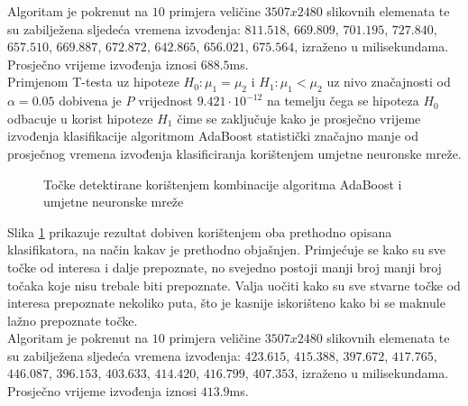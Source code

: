 \documentclass[times, utf8, zavrsni, numeric]{fer}
\begin{document}
Algoritam je pokrenut na $10$ primjera veličine $3507x2480$ slikovnih elemenata te su zabilježena sljedeća vremena izvođenja: $811.518$, $669.809$, $701.195$, $727.840$, $657.510$, $669.887$, $672.872$, $642.865$, $656.021$, $675.564$, izraženo u milisekundama. 
Prosječno vrijeme izvođenja iznosi $688.5$ms.\\

Primjenom T-testa uz hipoteze $H_0: \mu_1 = \mu_2$ i $H_1: \mu_1 < \mu_2$ uz nivo značajnosti od $\alpha = 0.05$ dobivena je $P$ vrijednost $9.421\cdot10^{-12}$ na temelju čega se hipoteza $H_0$ odbacuje u korist hipoteze $H_1$ čime se zaključuje kako je prosječno vrijeme izvođenja klasifikacije algoritmom AdaBoost statistički značajno manje od prosječnog vremena izvođenja klasificiranja korištenjem umjetne neuronske mreže.

\begin{figure}[!ht]
    \centering
    \captionsetup{justification=centering}
    \caption{Točke detektirane korištenjem kombinacije algoritma AdaBoost i umjetne neuronske mreže}
    \label{fig:combinedResult}
\end{figure}

Slika \ref{fig:combinedResult} prikazuje rezultat dobiven korištenjem oba prethodno opisana klasifikatora, na način kakav je prethodno objašnjen.
Primjećuje se kako su sve točke od interesa i dalje prepoznate, no svejedno postoji manji broj manji broj točaka koje nisu trebale biti prepoznate.
Valja uočiti kako su sve stvarne točke od interesa prepoznate nekoliko puta, što je kasnije iskorišteno kako bi se maknule lažno prepoznate točke.\\

Algoritam je pokrenut na $10$ primjera veličine $3507x2480$ slikovnih elemenata te su zabilježena sljedeća vremena izvođenja: $423.615$, $415.388$, $397.672$, $417.765$, $446.087$, $396.153$, $403.633$, $414.420$, $416.799$, $407.353$, izraženo u milisekundama. 
Prosječno vrijeme izvođenja iznosi $413.9$ms.\\
\end{document}

